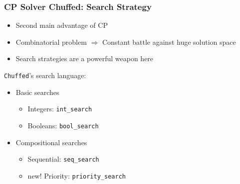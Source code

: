 \documentclass{beamer}
\begin{document}
\begin{frame}
\frametitle{CP Solver Chuffed: Search Strategy}
\begin{itemize}
	\item Second main advantage of CP\vspace{1mm}
	\item Combinatorial problem $\Rightarrow$ Constant battle against huge solution space\vspace{1mm}\pause
	\item Search strategies are a powerful weapon here\pause
\end{itemize}
\vspace{3mm}
{\tt Chuffed}'s search language:\vspace{2mm}\pause
\begin{itemize}
	\item Basic searches\vspace{1mm}
	\begin{itemize}
		\item Integers: {\tt int\_search}\vspace{1mm}
		\item Booleans: {\tt bool\_search}\vspace{2mm}\pause
	\end{itemize}
	\item Compositional searches\vspace{1mm}
	\begin{itemize}
		\item Sequential: {\tt seq\_search}\vspace{1mm}\pause
		\item {\color{red} new!} Priority: {\tt priority\_search}
	\end{itemize}
\end{itemize}
\end{frame}
\end{document}
